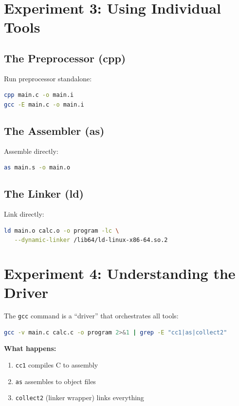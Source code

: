 \section{Experiment 3: Using Individual Tools}

\subsection{The Preprocessor (cpp)}

Run preprocessor standalone:

\begin{lstlisting}[language=bash]
cpp main.c -o main.i
gcc -E main.c -o main.i
\end{lstlisting}

\subsection{The Assembler (as)}

Assemble directly:

\begin{lstlisting}[language=bash]
as main.s -o main.o
\end{lstlisting}

\subsection{The Linker (ld)}

Link directly:

\begin{lstlisting}[language=bash]
ld main.o calc.o -o program -lc \
   --dynamic-linker /lib64/ld-linux-x86-64.so.2
\end{lstlisting}

\section{Experiment 4: Understanding the Driver}

The \texttt{gcc} command is a ``driver'' that orchestrates all tools:

\begin{lstlisting}[language=bash]
gcc -v main.c calc.c -o program 2>&1 | grep -E "cc1|as|collect2"
\end{lstlisting}

\textbf{What happens:}
\begin{enumerate}
\item \texttt{cc1} compiles C to assembly
\item \texttt{as} assembles to object files
\item \texttt{collect2} (linker wrapper) links everything
\end{enumerate}

